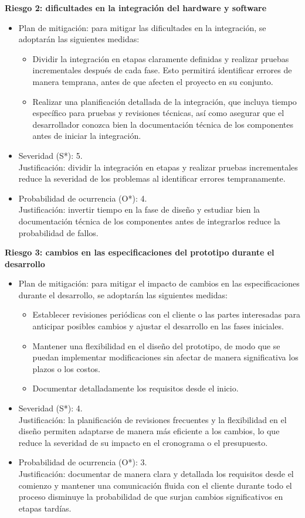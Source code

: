 \documentclass[
11pt, %
]{charter}
\begin{document}
\textbf{Riesgo 2: dificultades en la integración del hardware y software}
\begin{itemize}
	\item Plan de mitigación: para mitigar las dificultades en la integración, se adoptarán las siguientes medidas:
	\begin{itemize}
	    \item Dividir la integración en etapas claramente definidas y realizar pruebas incrementales después de cada fase. Esto permitirá identificar errores de manera temprana, antes de que afecten el proyecto en su conjunto.
    	\item Realizar una planificación detallada de la integración, que incluya tiempo específico para pruebas y revisiones técnicas, así como asegurar que el desarrollador conozca bien la documentación técnica de los componentes antes de iniciar la integración.
	\end{itemize}
    \item Severidad (S*): 5.\\
    Justificación: dividir la integración en etapas y realizar pruebas incrementales reduce la severidad de los problemas al identificar errores tempranamente.
    \item Probabilidad de ocurrencia (O*): 4.\\
    Justificación: invertir tiempo en la fase de diseño y estudiar bien la documentación técnica de los componentes antes de integrarlos reduce la probabilidad de fallos.
\end{itemize}

\textbf{Riesgo 3: cambios en las especificaciones del prototipo durante el desarrollo}
\begin{itemize}
	\item Plan de mitigación: para mitigar el impacto de cambios en las especificaciones durante el desarrollo, se adoptarán las siguientes medidas:
	\begin{itemize}
		\item Establecer revisiones periódicas con el cliente o las partes interesadas para anticipar posibles cambios y ajustar el desarrollo en las fases iniciales.
		\item Mantener una flexibilidad en el diseño del prototipo, de modo que se puedan implementar modificaciones sin afectar de manera significativa los plazos o los costos.
		\item Documentar detalladamente los requisitos desde el inicio.
	\end{itemize}
    \item Severidad (S*): 4.\\
    Justificación: la planificación de revisiones frecuentes y la flexibilidad en el diseño permiten adaptarse de manera más eficiente a los cambios, lo que reduce la severidad de su impacto en el cronograma o el presupuesto.
    \item Probabilidad de ocurrencia (O*): 3.\\
    Justificación: documentar de manera clara y detallada los requisitos desde el comienzo y mantener una comunicación fluida con el cliente durante todo el proceso disminuye la probabilidad de que surjan cambios significativos en etapas tardías.
\end{itemize}
\end{document}

